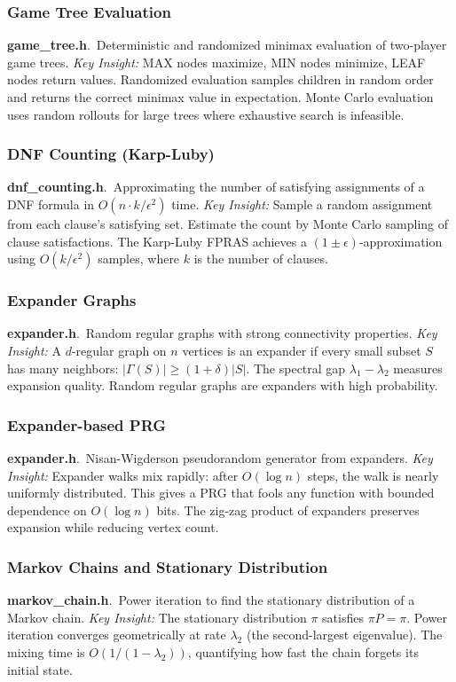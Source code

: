 \documentclass[11pt,a4paper]{article}
\newcommand{\algo}[2]{\textbf{#1}.\ #2}
\newcommand{\insight}{\textit{Key Insight: }}
\begin{document}
\subsubsection{Game Tree Evaluation}
\algo{game\_tree.h}{Deterministic and randomized minimax evaluation of two-player game trees.}
\insight MAX nodes maximize, MIN nodes minimize, LEAF nodes return values. Randomized evaluation samples children in random order and returns the correct minimax value in expectation. Monte Carlo evaluation uses random rollouts for large trees where exhaustive search is infeasible.

\subsubsection{DNF Counting (Karp-Luby)}
\algo{dnf\_counting.h}{Approximating the number of satisfying assignments of a DNF formula in \(O(n \cdot k / \epsilon^2)\) time.}
\insight Sample a random assignment from each clause's satisfying set. Estimate the count by Monte Carlo sampling of clause satisfactions. The Karp-Luby FPRAS achieves a \((1 \pm \epsilon)\)-approximation using \(O(k/\epsilon^2)\) samples, where \(k\) is the number of clauses.

\subsubsection{Expander Graphs}
\algo{expander.h}{Random regular graphs with strong connectivity properties.}
\insight A \(d\)-regular graph on \(n\) vertices is an expander if every small subset \(S\) has many neighbors: \(|\Gamma(S)| \ge (1+\delta)|S|\). The spectral gap \(\lambda_1 - \lambda_2\) measures expansion quality. Random regular graphs are expanders with high probability.

\subsubsection{Expander-based PRG}
\algo{expander.h}{Nisan-Wigderson pseudorandom generator from expanders.}
\insight Expander walks mix rapidly: after \(O(\log n)\) steps, the walk is nearly uniformly distributed. This gives a PRG that fools any function with bounded dependence on \(O(\log n)\) bits. The zig-zag product of expanders preserves expansion while reducing vertex count.

\subsubsection{Markov Chains and Stationary Distribution}
\algo{markov\_chain.h}{Power iteration to find the stationary distribution of a Markov chain.}
\insight The stationary distribution \(\pi\) satisfies \(\pi P = \pi\). Power iteration converges geometrically at rate \(\lambda_2\) (the second-largest eigenvalue). The mixing time is \(O(1/(1-\lambda_2))\), quantifying how fast the chain forgets its initial state.
\end{document}
